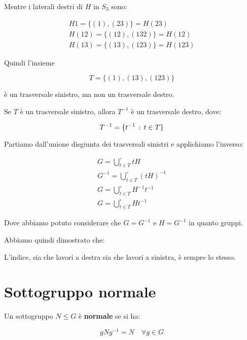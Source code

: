 Mentre i laterali destri di $H$ in $S_3$ sono:

\begin{gather}
	H1 = \{(1), (23)\} = H(23) \\
	H(12) = \{(12), (132)\} = H(12) \\
	H(13) = \{(13), (123)\} = H(123)
\end{gather}

Quindi l'insieme

\begin{equation}
	T = \{(1), (13), (123)\}
\end{equation}

è un trasversale sinistro, ma non un trasversale destro.

\begin{teorema}
	Se $T$ è un trasversale sinistro, allora $T^{-1}$ è un trasversale destro, dove:
	
	\begin{equation}
		T^{-1} = \{t^{-1} \,:\, t \in T\}
	\end{equation}
\end{teorema}
\begin{dimostrazione}
	Partiamo dall'unione disgiunta dei trasversali sinistri e applichiamo l'inverso:
	
	\begin{gather}
		G = \bigcup^\circ_{t \in T} tH \\
		G^{-1} = \bigcup^\circ_{t \in T} (tH)^{-1} \\
		G = \bigcup^\circ_{t \in T} H^{-1}t^{-1} \\
		G = \bigcup^\circ_{t \in T} Ht^{-1}
	\end{gather}

	Dove abbiamo potuto considerare che $G = G^{-1}$ e $H = G^{-1}$ in quanto gruppi.
\end{dimostrazione}

Abbiamo quindi dimostrato che:

\begin{teorema}
	L'indice, sia che lavori a destra sia che lavori a sinistra, è sempre lo stesso.
\end{teorema}

\section{Sottogruppo normale}

Un sottogruppo $N \le G$ è \textbf{normale} se si ha:

\begin{equation}
	gNg^{-1} = N \quad \forall g \in G
\end{equation}

